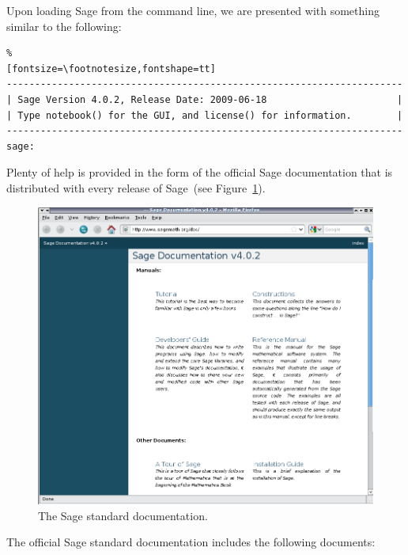 Upon loading Sage from the command line, we are presented with
something similar to the following:
%
\begin{Verbatim}%
[fontsize=\footnotesize,fontshape=tt]
----------------------------------------------------------------------
| Sage Version 4.0.2, Release Date: 2009-06-18                       |
| Type notebook() for the GUI, and license() for information.        |
----------------------------------------------------------------------
sage:
\end{Verbatim}
%
Plenty of help is provided in the form of the official Sage
documentation that is distributed with every release of Sage~(see
Figure~\ref{fig:sage_standard_doc}).
%
\begin{figure}[!htpb]
\centering
\includegraphics[scale=0.4]{figures/sage-online-doc}
\caption{The Sage standard documentation.}
\label{fig:sage_standard_doc}
\end{figure}
%
The official Sage standard documentation includes the following documents:

